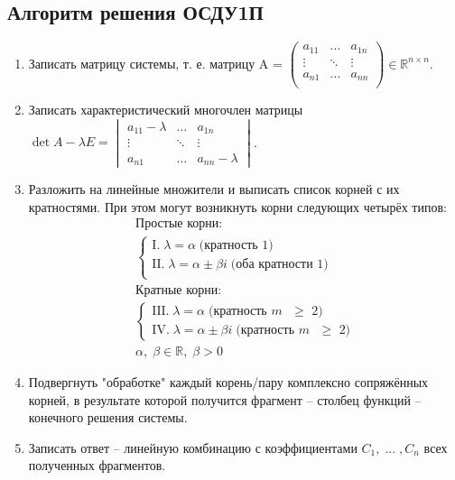 \documentclass[10pt, a4paper]{article}
\begin{document}
\subsection{Алгоритм решения ОСДУ1П}
\begin{enumerate}
    \item Записать матрицу системы, т. е. матрицу A =
    $\begin{pmatrix}
        a_{11} & \ldots & a_{1n} \\
        \vdots & \ddots & \vdots \\
        a_{n1} & \ldots & a_{nn} \\
    \end{pmatrix}
    \in \mathbb{R}^{n \times n}.$
    \item Записать характеристический многочлен матрицы $\det{A - \lambda E} =
    \begin{vmatrix}
        a_{11} - \lambda & \ldots & a_{1n} \\
        \vdots           & \ddots & \vdots \\
        a_{n1}           & \ldots & a_{nn} - \lambda
    \end{vmatrix}$.
    \item Разложить на линейные множители и выписать список корней с их кратностями. При этом могут возникнуть корни следующих четырёх типов:
    \begin{gather*}
        \text{Простые корни:} \\
            \begin{cases}
                \text{I.} \; \lambda = \alpha \; \text{(кратность 1)} \\
                \text{II.} \; \lambda = \alpha \pm \beta i \; \text{(оба кратности 1)} \\
            \end{cases} \\
        \text{Кратные корни:} \\
            \begin{cases}
                \text{III.} \; \lambda = \alpha \; \text{(кратность $m$ $\geq$ 2)} \\
                \text{IV.} \; \lambda = \alpha \pm \beta i \; \text{(кратность $m$ $\geq$ 2)}
            \end{cases} \\
        \alpha, \; \beta \in \mathbb{R}, \; \beta > 0
    \end{gather*}
    \item Подвергнуть "обработке" каждый корень/пару комплексно сопряжённых корней, в результате которой получится фрагмент -- столбец функций -- конечного решения системы.
    \item Записать ответ -- линейную комбинацию с коэффициентами $C_1, \; ... \;, C_n$ всех полученных фрагментов.
\end{enumerate}
\end{document}
